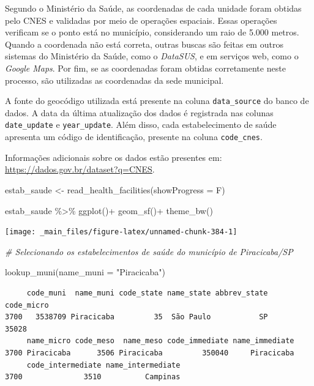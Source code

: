 \documentclass[
  brazilian,
]{book}
\newenvironment{Shaded}{\begin{snugshade}}{\end{snugshade}}
\newcommand{\AttributeTok}[1]{\textcolor[rgb]{0.77,0.63,0.00}{#1}}
\newcommand{\CommentTok}[1]{\textcolor[rgb]{0.56,0.35,0.01}{\textit{#1}}}
\newcommand{\FunctionTok}[1]{\textcolor[rgb]{0.00,0.00,0.00}{#1}}
\newcommand{\NormalTok}[1]{#1}
\newcommand{\OtherTok}[1]{\textcolor[rgb]{0.56,0.35,0.01}{#1}}
\newcommand{\SpecialCharTok}[1]{\textcolor[rgb]{0.00,0.00,0.00}{#1}}
\newcommand{\StringTok}[1]{\textcolor[rgb]{0.31,0.60,0.02}{#1}}
\begin{document}
Segundo o Ministério da Saúde, as coordenadas de cada unidade foram obtidas pelo CNES e validadas por meio de operações espaciais. Essas operações verificam se o ponto está no município, considerando um raio de 5.000 metros. Quando a coordenada não está correta, outras buscas são feitas em outros sistemas do Ministério da Saúde, como o \emph{DataSUS}, e em serviços web, como o \emph{Google Maps}. Por fim, se as coordenadas foram obtidas corretamente neste processo, são utilizadas as coordenadas da sede municipal.

A fonte do geocódigo utilizada está presente na coluna \texttt{data\_source} do banco de dados. A data da última atualização dos dados é registrada nas colunas \texttt{date\_update} e \texttt{year\_update}. Além disso, cada estabelecimento de saúde apresenta um código de identificação, presente na coluna \texttt{code\_cnes}.

Informações adicionais sobre os dados estão presentes em: \url{https://dados.gov.br/dataset?q=CNES}.

\begin{Shaded}
\begin{Highlighting}[]
\NormalTok{estab\_saude }\OtherTok{\textless{}{-}} \FunctionTok{read\_health\_facilities}\NormalTok{(}\AttributeTok{showProgress =}\NormalTok{ F)}

\NormalTok{estab\_saude }\SpecialCharTok{\%\textgreater{}\%} 
  \FunctionTok{ggplot}\NormalTok{()}\SpecialCharTok{+}
  \FunctionTok{geom\_sf}\NormalTok{()}\SpecialCharTok{+}
  \FunctionTok{theme\_bw}\NormalTok{()}
\end{Highlighting}
\end{Shaded}

\begin{center}\texttt{[image: \_main\_files/figure-latex/unnamed-chunk-384-1]} \end{center}

\begin{Shaded}
\begin{Highlighting}[]
\CommentTok{\# Selecionando os estabelecimentos de saúde do município de Piracicaba/SP}

\FunctionTok{lookup\_muni}\NormalTok{(}\AttributeTok{name\_muni =} \StringTok{"Piracicaba"}\NormalTok{)}
\end{Highlighting}
\end{Shaded}

\begin{verbatim}
     code_muni  name_muni code_state name_state abbrev_state code_micro
3700   3538709 Piracicaba         35  São Paulo           SP      35028
     name_micro code_meso  name_meso code_immediate name_immediate
3700 Piracicaba      3506 Piracicaba         350040     Piracicaba
     code_intermediate name_intermediate
3700              3510          Campinas
\end{verbatim}
\end{document}

